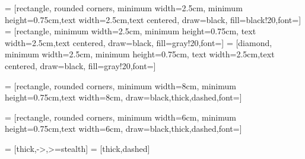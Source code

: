 \newcommand\sHeigh{0.75cm}
\newcommand\sWidth{2.5cm}
\newcommand\dWidth{8cm}

\newcommand\dWidthB{6cm}

\newcommand\xShift{4cm}
\newcommand\xShiftB{3cm}


\usetikzlibrary{shapes.geometric, arrows}

 = [rectangle, rounded corners, minimum width=\sWidth, minimum height=\sHeigh,text width=\sWidth,text centered, draw=black, fill=black!20,font=\footnotesize]
 = [rectangle, minimum width=\sWidth, minimum height=\sHeigh, text width=\sWidth,text centered, draw=black, fill=gray!20,font=\footnotesize]
 = [diamond, minimum width=\sWidth, minimum height=\sHeigh, text width=\sWidth,text centered, draw=black, fill=gray!20,font=\footnotesize]

 = [rectangle, rounded corners, minimum width=\dWidth, minimum height=\sHeigh,text width=\dWidth, draw=black,thick,dashed,font=\footnotesize]

 = [rectangle, rounded corners, minimum width=\dWidthB, minimum height=\sHeigh,text width=\dWidthB, draw=black,thick,dashed,font=\footnotesize]

 = [thick,->,>=stealth]
 = [thick,dashed]



